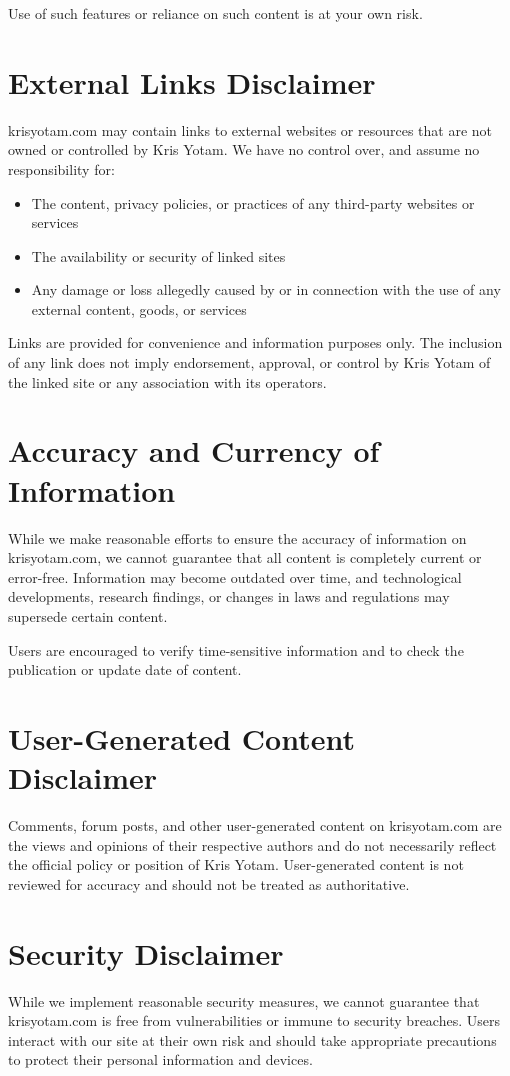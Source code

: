 \documentclass[11pt]{article}
\begin{document}
Use of such features or reliance on such content is at your own risk.

\section{External Links Disclaimer}
krisyotam.com may contain links to external websites or resources that are not owned or controlled by Kris Yotam. We have no control over, and assume no responsibility for:
\begin{itemize}
  \item The content, privacy policies, or practices of any third-party websites or services
  \item The availability or security of linked sites
  \item Any damage or loss allegedly caused by or in connection with the use of any external content, goods, or services
\end{itemize}

Links are provided for convenience and information purposes only. The inclusion of any link does not imply endorsement, approval, or control by Kris Yotam of the linked site or any association with its operators.

\section{Accuracy and Currency of Information}
While we make reasonable efforts to ensure the accuracy of information on krisyotam.com, we cannot guarantee that all content is completely current or error-free. Information may become outdated over time, and technological developments, research findings, or changes in laws and regulations may supersede certain content.

Users are encouraged to verify time-sensitive information and to check the publication or update date of content.

\section{User-Generated Content Disclaimer}
Comments, forum posts, and other user-generated content on krisyotam.com are the views and opinions of their respective authors and do not necessarily reflect the official policy or position of Kris Yotam. User-generated content is not reviewed for accuracy and should not be treated as authoritative.

\section{Security Disclaimer}
While we implement reasonable security measures, we cannot guarantee that krisyotam.com is free from vulnerabilities or immune to security breaches. Users interact with our site at their own risk and should take appropriate precautions to protect their personal information and devices.
\end{document}
